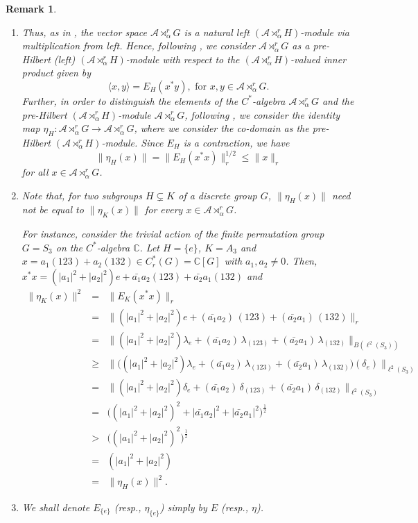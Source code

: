 \documentclass{amsart}
\numberwithin{equation}{section}
\newcommand{\C}{\mathbb C}
\newcommand{\1}{\mathbf{1}}
\newcommand{\mA}{\mathcal{A}}
\newtheorem{remark}[theorem]{Remark}
\begin{document}
\begin{remark}
\begin{enumerate}
\item Thus, as in , the vector
  space $\mA\rtimes^r_{\alpha}G$ is a natural left $(\mA
  \rtimes^r_{\alpha} H)$-module via multiplication from left. Hence,
  following \cite{Wat}, we consider $\mA \rtimes^r_{\alpha}G$ as a
  pre-Hilbert (left) $(\mA \rtimes^r_{\alpha} H)$-module with respect
  to the $(\mA \rtimes^r_{\alpha} H)$-valued inner product given by
\[
\langle x , y \rangle = E_H(x^*y), \text{ for } x, y \in \mA \rtimes^r_{\alpha}G.
\]
Further, in order to distinguish the elements of the $C^*$-algebra
$\mA \rtimes^r_{\alpha}G$ and the pre-Hilbert $(\mA \rtimes^r_{\alpha}
H)$-module $\mA \rtimes^r_{\alpha}G$, following \cite{Wat}, we
consider the identity map $\eta_H : \mA \rtimes^r_{\alpha}G
\rightarrow \mA \rtimes^r_{\alpha}G$, where we consider the co-domain
as the pre-Hilbert $(\mA \rtimes^r_{\alpha}H)$-module.  Since $E_H$ is
a contraction, we have
 \begin{equation}\label{r-eta-relation}
\|\eta_H(x)\|  = \|E_H(x^*x)\|^{1/2}_r \leq \|x\|_r
  \end{equation}
  for all $ x \in \mA \rtimes^r_{\alpha} G$.
\item Note that, for two subgroups $H \subsetneq K$ of a discrete
  group $ G$, $\|\eta_H(x)\|$ need not be equal to $\|\eta_K(x)\|$ for
  every $x \in \mA \rtimes^r_{\alpha} G$.
  
  For instance, consider the trivial action of the finite permutation
  group $G=S_{3}$ on the $C^*$-algebra $\mathbb{C}$. Let $H=\{e\}$,
  $K=A_{3}$ and $x=a_{1}(123)+a_{2}(132)\in C_{r}^*(G) = \C[G]$ with
  $a_1,a_2\neq 0$. Then, $x^*x= (|a_{1}|^2+|a_{2}|^2)e+
  \bar{a_1}a_2(123)+\bar{a_2}a_1(132)$ and 
 \begin{eqnarray*}
   \|\eta_K(x)\|^{2} &=& \|E_K(x^*x)\|_r\\ & = &
   \Big\|(|a_{1}|^2+|a_{2}|^2){e}+ (\bar{a_1}a_2)\,
         {(123)}+(\bar{a_2}a_1)\, {(132)}\Big\|_r \\ & = &
         \Big\|(|a_{1}|^2+|a_{2}|^2)\lambda_{e}+ (\bar{a_1}a_2)\,
         \lambda_{(123)}+(\bar{a_2}a_1)\,
         \lambda_{(132)}\Big\|_{B(\ell^2(S_3))}\\ &\geq &
         \Big\|\Big((|a_{1}|^2+|a_{2}|^2)\lambda_{e}+ (\bar{a_1}a_2)\,
         \lambda_{(123)}+(\bar{a_2}a_1)\,
         \lambda_{(132)}\Big)(\delta_{e})\Big\|_{\ell^2(S_3)}\\ &=&
         \Big\|(|a_{1}|^2+|a_{2}|^2)\delta_{e}+
         (\bar{a_1}a_2)\,\delta_{(123)}+(\bar{a_2}a_1)\,\delta_{(132)}
         \Big\|_{\ell^2(S_3)} \\ & =& \Big((|a_{1}|^2+|a_{2}|^2)^2+
         |\bar{a_1}a_2|^2+ |\bar{a_2}a_1|^2\Big)^{\frac{1}{2}}\\ &>&
         \Big((|a_{1}|^2+|a_{2}|^2)^2\Big)^{\frac{1}{2}}\\ &=&
         (|a_{1}|^2+|a_{2}|^2) \\ & = & \|\eta_H(x)\|^2 .
\end{eqnarray*}    
\item We shall denote $E_{\{e\}}$ (resp., $\eta_{\{e\}}$) simply by
  $E$ (resp., $\eta$).
\end{enumerate}
\end{remark}
\end{document}
